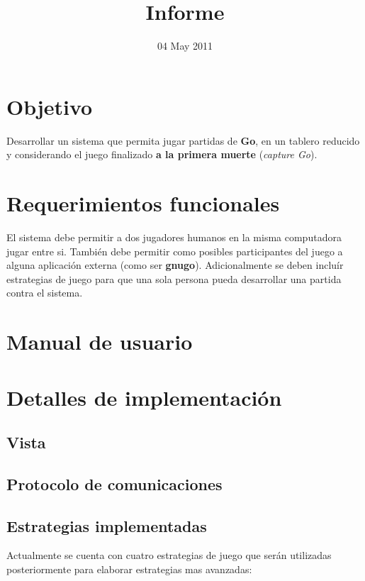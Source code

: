 \documentclass[11pt]{article}
\title{Informe}
\author{}
\date{04 May 2011}
\begin{document}
\thispagestyle{empty}
  

\setcounter{tocdepth}{3}
\tableofcontents
\vspace*{1cm}
\section{Objetivo}
\label{sec-1}

  Desarrollar un sistema que permita jugar partidas de \textbf{Go}, en un
  tablero reducido y considerando el juego finalizado \textbf{a la primera   muerte} (\emph{capture Go}).

\section{Requerimientos funcionales}
\label{sec-2}

  El sistema debe permitir a dos jugadores humanos en la misma
  computadora jugar entre si. También debe permitir como posibles
  participantes del juego a alguna aplicación externa (como ser
  \textbf{gnugo}). Adicionalmente se deben incluír estrategias de juego para
  que una sola persona pueda desarrollar una partida contra el
  sistema.

\section{Manual de usuario}
\label{sec-3}


\section{Detalles de implementación}
\label{sec-4}

\subsection{Vista}
\label{sec-4.1}

\subsection{Protocolo de comunicaciones}
\label{sec-4.2}

\subsection{Estrategias implementadas}
\label{sec-4.3}

   Actualmente se cuenta con cuatro estrategias de juego que serán
   utilizadas posteriormente para elaborar estrategias mas avanzadas:
\end{document}
